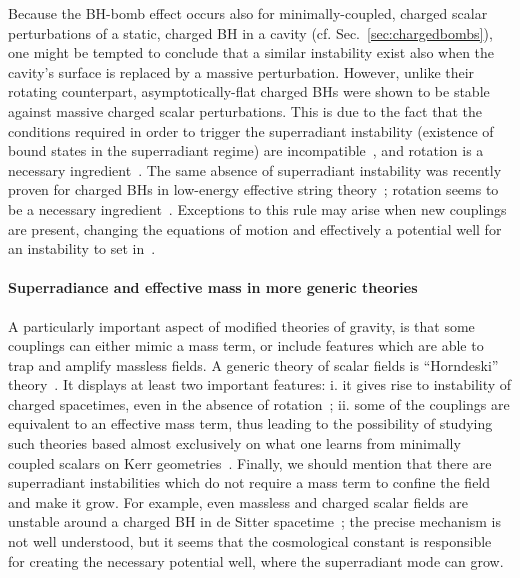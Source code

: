 \documentclass[11pt]{article}
\numberwithin{equation}{section} %
\begin{document}
Because the BH-bomb effect occurs also for minimally-coupled, charged scalar perturbations of a static, charged BH in a
cavity (cf. Sec.~\ref{sec:chargedbombs}), one might be tempted to conclude that a similar instability exist also when 
the cavity's surface is replaced by a massive perturbation. However, unlike their rotating counterpart, 
asymptotically-flat charged BHs were shown to be stable against massive charged scalar perturbations. This is due to the 
fact that the conditions required in order to trigger the superradiant instability (existence of bound states in the 
superradiant regime) are incompatible~\cite{Hod:2013eea,Hod:2013nn}, and rotation is a necessary ingredient~\cite{Hod:2016bas}. The same absence of superradiant instability was recently proven for charged BHs in low-energy effective string theory~\cite{Zhang:2015jda}; rotation seems to be a necessary ingredient~\cite{Siahaan:2015xna}. Exceptions to this rule may arise when new couplings are present, changing the equations of motion and effectively a potential well for an instability to set in~\cite{Kolyvaris:2018zxl}.

\paragraph{Superradiance and effective mass in more generic theories}
A particularly important aspect of modified theories of gravity, is that some couplings can either mimic a mass term, or include features which are able to trap and amplify massless fields. A generic theory of scalar fields is ``Horndeski'' theory~\cite{Horndeski:1974wa,Berti:2015itd}. It displays at least two important features: i. it gives rise to instability of charged spacetimes, even in the absence of rotation~\cite{Kolyvaris:2018zxl}; ii. 
some of the couplings are equivalent to an effective mass term, thus leading to the possibility of studying such theories based almost exclusively on what one learns from
minimally coupled scalars on Kerr geometries~\cite{Tattersall:2019pvx}.
Finally, we should mention that there are superradiant instabilities which do not require a mass term to confine the field and make it grow. 
For example, even massless and charged scalar fields are unstable around a charged BH in de Sitter spacetime~\cite{Zhu:2014sya,Konoplya:2014lha,Destounis:2019hca}; the precise mechanism is not well understood, but it seems that the cosmological constant is responsible for creating the necessary potential well, where the superradiant mode can grow.
\end{document}
